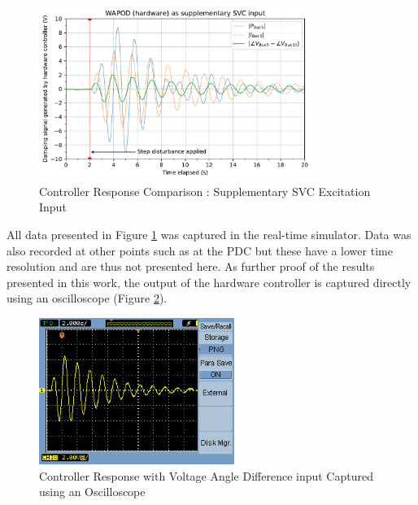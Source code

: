 \documentclass[journal]{IEEEtran}
\begin{document}
\begin{figure}[thpb]
\centering
\includegraphics[width=3.5in]{Controller_Response_SVC_input.pdf}
\caption{Controller Response Comparison : Supplementary SVC Excitation Input}
\label{SVC_Plots}
\vspace{-1em}
\end{figure}

All data presented in Figure \ref{SVC_Plots} was captured in the real-time simulator. Data was also recorded at other points such as at the PDC but these have a lower time resolution and are thus not presented here. As further proof of the results presented in this work, the output of the hardware controller is captured directly using an oscilloscope (Figure \ref{ScopeCapture}).

\begin{figure}[thbp]
\centering
\includegraphics[width=2.5in]{Best_sample.png}
\caption{Controller Response with Voltage Angle Difference input Captured using an Oscilloscope}
\label{ScopeCapture}
\vspace{-1em}
\end{figure}
\end{document}
